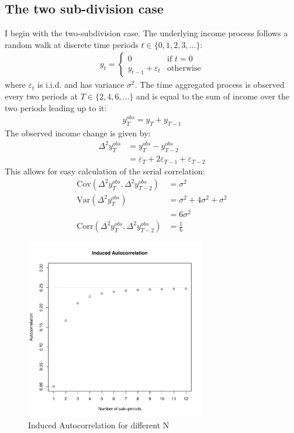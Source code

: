 \documentclass[AER]{AEA}
\begin{document}
\subsection{The two sub-division case}
I begin with the two-subdivision case. The underlying income process follows a random walk at discrete time periods $t\in \{0,1,2,3,...\}$:
\begin{align*}
y_t = \begin{cases}
0 \qquad & \text{if } t=0\\
y_{t-1} + \varepsilon_t & \text{otherwise}
\end{cases}
\end{align*}
where $\varepsilon_t$ is i.i.d. and has variance $\sigma^2$. The  time aggregated process is observed every two periods at $T\in\{2,4,6,...\}$ and is equal to the sum of income over the two periods leading up to it:
\begin{align*}
y_T^{obs} = y_T + y_{T-1}
\end{align*}
The observed income change is given by:
\begin{align*}
\Delta^2 y_T^{obs} &= y_T^{obs} - y_{T-2}^{obs} \\
&= \varepsilon_T + 2\varepsilon_{T-1} + \varepsilon_{T-2}
\end{align*}
This allows for easy calculation of the serial correlation:
\begin{align*}
\mathrm{Cov}(\Delta^2 y_T^{obs},\Delta^2 y_{T-2}^{obs}) &= \sigma^2 \\
\mathrm{Var}(\Delta^2 y_T^{obs}) &= \sigma^2 + 4\sigma^2 + \sigma^2 \\
&= 6\sigma^2 \\
\mathrm{Corr}(\Delta^2 y_T^{obs},\Delta^2 y_{T-2}^{obs}) &= \frac{1}{6}
\end{align*}
\begin{figure}
	\includegraphics[width=0.7\textwidth]{../Code/Figures/InducedAutocorrelation.pdf}
	\caption{Induced Autocorrelation for different N}
	\label{fig:InducedAutocorrelation}
\end{figure}
\end{document}
